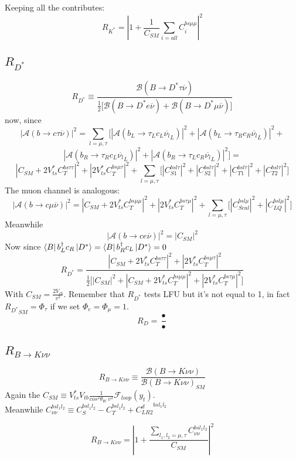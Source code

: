 \documentclass{article}
\begin{document}
Keeping all the contributes:
\[
R_{K^*} =|1+ \frac{1}{C_{SM}}  \sum_{i=all} C_i^{bs \mu \mu}  |^2
\]

\subsection{$R_{D^*}$}
\[
R_{D^*} \equiv \frac{\mathcal{B}(B \rightarrow D^* \tau  \overline{\nu})}{\frac{1}{2} \big[ \mathcal{B}(B \rightarrow D^* e \overline{\nu} ) + \mathcal{B}(B \rightarrow D^* \mu \overline{\nu} )  \big] }
\]
now, since
\[
|\mathcal{A}(b \rightarrow c \tau \overline{\nu})|^2= \sum_{l=\mu, \tau} \big[|\mathcal{A}(b_L \rightarrow \tau_L c_L \overline{\nu_l}_L)|^2 + |\mathcal{A}(b_L \rightarrow \tau_R c_R \overline{\nu_l}_L)|^2 + 
\]
\[
|\mathcal{A}(b_R \rightarrow \tau_R c_L \overline{\nu_l}_L)|^2 + |\mathcal{A}(b_R \rightarrow \tau_L c_R \overline{\nu_l}_L)|^2  \big]=
\]
\[
|C_{SM} + 2V^*_{ts} C_T^{bs\tau\tau}|^2 + |2V^*_{ts} C_T^{bs\mu\tau}|^2 
+ \sum_{l=\mu, \tau} \big[| C^{bsl\tau}_{S1}|^2 +  |C^{bsl\tau}_{S2}|^2 + |C^{bsl\tau}_{T1}|^2 + |C^{bsl\tau}_{T2}|^2\big]
\]
The muon channel is analogous:
\[
|\mathcal{A}(b\rightarrow c \mu \overline{\nu} )|^2 = 
|C_{SM} + 2V^*_{ts}C_T^{bs\mu\mu}|^2 + |2V^*_{ts}C_T^{bs\tau\mu}|^2 
+ \sum_{l=\mu, \tau} \big[| C^{bsl\mu}_{Scal}|^2 +  |C^{bsl\mu}_{LQ}|^2\big]
\]
Meanwhile
\[
|\mathcal{A}(b\rightarrow c e \overline{\nu} )|^2 = |C_{SM}|^2 
\]
Now since $\bra{B} b_L^\dagger c_R\ket{D^*}=\bra{B} b_R^\dagger c_L\ket{D^*}=0$
\[
R_{D^*}=\frac{|C_{SM} + 2V^*_{ts} C_T^{bs\tau\tau}|^2 + |2V^*_{ts} C_T^{bs\mu\tau}|^2 }{\frac{1}{2}\big[ |C_{SM}|^2 +|C_{SM} + 2V^*_{ts}C_T^{bs\mu\mu}|^2 + |2V^*_{ts}C_T^{bs\tau\mu}|^2\big]}
\]
With $C_{SM}= \frac{2V_{cb}}{v^2}$. Remember that $R_{D^*}$ tests LFU but it's not equal to 1, in fact ${R_{D^*}}_{SM} = \Phi_\tau$ if we set $\Phi_e=\Phi_\mu=1$.\\
\[
R_{D}= \frac{•}{•}
\]


\subsection{$R_{B\rightarrow K \nu \nu}$}
\[
R_{B\rightarrow K \nu \nu} \equiv \frac{\mathcal{B}(B\rightarrow K \nu \nu)}{\mathcal{B}(B\rightarrow K \nu \nu)_{SM}}
\]
Again the $C_{SM} \equiv V_{ts}^* V_{tb} \frac{1}{cos^2 \theta_W \ v^2} \mathcal{F}_{loop}(y_t)$.\\
Meanwhile $C_{\nu \nu}^{bs l_1 l_2} \equiv C_S^{bsl_1 l_2} - C_T^{bsl_1 l_2} + {C_{LR2}^d}^{bsl_1 l_2}$

\[
R_{B\rightarrow K \nu \nu} =  |1+ \frac{\sum_{l_1, l_2 = \mu , \tau} C_{\nu \nu}^{bsl_1 l_2}}{C_{SM}}|^2
\]
\end{document}
